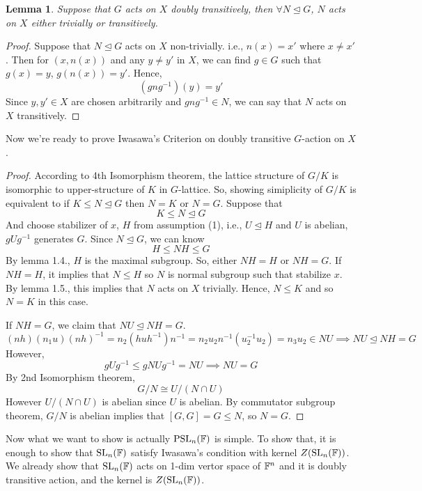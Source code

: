 \documentclass[12pt, letterpaper]{amsart}
\newtheorem{lem}[thm]{Lemma}
\theoremstyle{definition}
\theoremstyle{remark}
\newcommand{\PSL}{{\mathrm{PSL}}}
\theoremstyle{plain}
\newcommand{\normal}{\trianglelefteq}
\numberwithin{equation}{section}
\begin{document}
\begin{lem}
    Suppose that $G$ acts on $X$ doubly transitively, then $\forall N \normal G$, $N$ acts on $X$ either trivially or transitively. 
\end{lem}

\begin{proof}
    Suppose that $N \normal G$ acts on $X$ non-trivially. i.e., $n(x) = x'$ where $x \neq x'$. 
    Then for $(x, n(x))$ and any $y \neq y'$ in $X$, we can find $g \in G$ such that 
    $g(x) = y$, $g(n(x)) = y'$. 
    Hence, 
    \[(g n g^{-1})(y) = y'\]
    Since $y, y' \in X$ are chosen arbitrarily and $gng^{-1} \in N$, we can say that $N$ acts on $X$ transitively. 
\end{proof}

\hrulefill

Now we're ready to prove Iwasawa's Criterion on doubly transitive $G$-action on $X$. 

\begin{proof}
    According to 4th Isomorphism theorem, the lattice structure of $G/K$ is 
    isomorphic to upper-structure of $K$ in $G$-lattice. 
    So, showing simiplicity of $G/K$ is equivalent to if $K \leq N \normal G$ then $N = K$ or $N = G$. 
    Suppose that 
    \[K \leq N \normal G\]
    And choose stabilizer of $x$, $H$ from assumption (1), i.e., $U \normal H$ and $U$ is abelian, $gUg^{-1}$ generates $G$. 
    Since $N \normal G$, we can know 
    \[H \leq NH \leq G\]
    By lemma 1.4., $H$ is the maximal subgroup. So, either $NH = H$ or $NH = G$. 
    If $NH = H$, it implies that $N \leq H$ so $N$ is normal subgroup such that stabilize $x$. 
    By lemma 1.5., this implies that $N$ acts on $X$ trivially. 
    Hence, $N \leq K$ and so $N = K$ in this case. 

    If $NH = G$, we claim that $NU \normal NH = G$. 
    \[(nh)(n_1u)(nh)^{-1} = n_2(huh^{-1})n^{-1} = n_2 u_2 n^{-1}(u_2^{-1} u_2) = n_3 u_2 \in NU \implies NU \normal NH = G\]
    However, 
    \[g U g^{-1} \leq g NU g^{-1} = NU \implies NU = G\]
    By 2nd Isomorphism theorem, 
    \[G/N \cong U/(N \cap U)\]
    However $U/(N \cap U)$ is abelian since $U$ is abelian. 
    By commutator subgroup theorem, $G/N$ is abelian implies that $[G, G] = G \leq N$, so $N = G$.
\end{proof}

\hrulefill

Now what we want to show is actually $\PSL_n(\BF)$ is simple. 
To show that, it is enough to show that ${\mathrm{SL}}_n({\mathbb {F}})$ satisfy Iwasawa's condition with 
kernel $Z({\mathrm{SL}}_n({\mathbb {F}}))$. 
We already show that ${\mathrm{SL}}_n({\mathbb {F}})$ acts on 1-dim vertor space of ${\mathbb {F}}^n$ and 
it is doubly transitive action, and the kernel is $Z({\mathrm{SL}}_n({\mathbb {F}}))$. 
\end{document}
